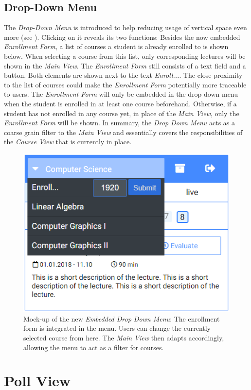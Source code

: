 \subsection{Drop-Down Menu}
\label{section:con:proposals:dropdown}
The \emph{Drop-Down Menu} is introduced to help reducing usage of vertical space even more (see ). Clicking on it reveals its two functions: Besides the now embedded \emph{Enrollment Form}, a list of courses a student is already enrolled to is shown below.
When selecting a course from this list, only corresponding lectures will be shown in the \emph{Main View}.
The \emph{Enrollment Form} still consists of a text field and a button. Both elements are shown next to the text \emph{Enroll...}. The close proximity to the list of courses could make the \emph{Enrollment Form} potentially more traceable to users. The \emph{Enrollment Form} will only be embedded in the drop down menu when the student is enrolled in at least one course beforehand. Otherwise, if a student has not enrolled in any course yet, in place of the \emph{Main View}, only the \emph{Enrollment Form} will be shown.
In summary, the \emph{Drop Down Menu} acts as a coarse grain filter to the \emph{Main View} and essentially covers the responsibilities of the \emph{Course View} that is currently in place.
\begin{figure}
	\begin{center}
		\includegraphics[width=.48\textwidth]{mockups/embedded_drop_down.png}
	\end{center}
	\captionsetup{format=plain}
	\caption{Mock-up of the new \emph{Embedded Drop Down Menu}:
		The enrollment form is integrated in the menu. Users can change the currently selected course from here. The \emph{Main View} then adapts accordingly, allowing the menu to act as a filter for courses.
	}
	\label{figure:embeddeddropdown}
	\vspace*{-0.75cm}
\end{figure}

\section{Poll View}
\label{section:con:proposals:pollview}

